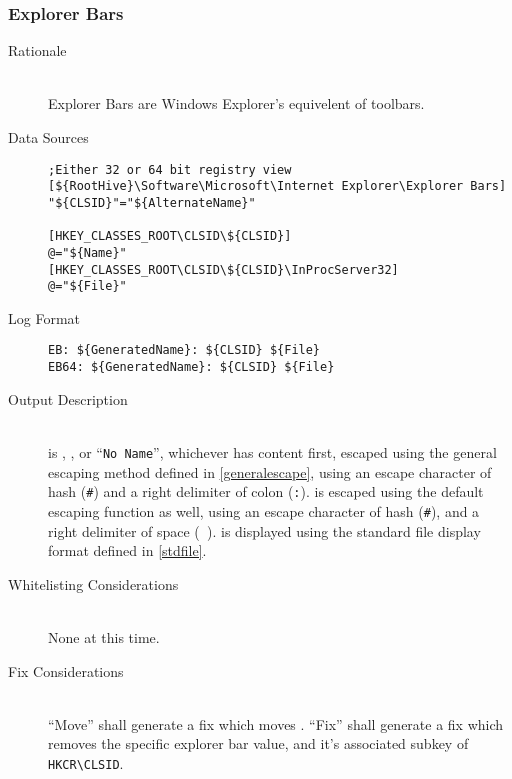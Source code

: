 \subsubsection{Explorer Bars}
\begin{description}
\item[Rationale] \hfill \\
Explorer Bars are Windows Explorer's equivelent of toolbars.
\item[Data Sources] \hfill
\vspace{-\baselineskip}
\begin{verbatim}
;Either 32 or 64 bit registry view
[${RootHive}\Software\Microsoft\Internet Explorer\Explorer Bars]
"${CLSID}"="${AlternateName}"

[HKEY_CLASSES_ROOT\CLSID\${CLSID}]
@="${Name}"
[HKEY_CLASSES_ROOT\CLSID\${CLSID}\InProcServer32]
@="${File}"
\end{verbatim}
\item[Log Format] \hfill
\vspace{-\baselineskip}
\begin{verbatim}
EB: ${GeneratedName}: ${CLSID} ${File}
EB64: ${GeneratedName}: ${CLSID} ${File}
\end{verbatim}
\item[Output Description] \hfill \\
 is , , or ``\verb|No Name|'',
whichever has content first, escaped using the general escaping method defined
in \ref{generalescape}, using an escape character of hash (\verb|#|) and a right
delimiter of colon (\verb|:|).  is escaped using the default escaping
function as well, using an escape character of hash (\verb|#|), and a right
delimiter of space (\verb| |).  is displayed using the standard file
display format defined in \ref{stdfile}.
\item[Whitelisting Considerations] \hfill \\
None at this time.
\item[Fix Considerations] \hfill \\
``Move'' shall generate a fix which moves . ``Fix'' shall generate a
fix which removes the specific explorer bar value, and it's associated subkey of
\verb|HKCR\CLSID|.
\end{description}

